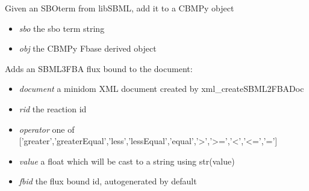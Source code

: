 \documentclass[a4paper,11pt,english]{sphinxmanual}
\begin{document}

\begin{fulllineitems}
\label{modules_doc:cbmpy.CBXML.setCBSBOterm}
Given an SBOterm from libSBML, add it to a CBMPy object
\begin{itemize}
\item {} 
\emph{sbo} the sbo term string

\item {} 
\emph{obj} the CBMPy Fbase derived object

\end{itemize}

\end{fulllineitems}


\begin{fulllineitems}
\label{modules_doc:cbmpy.CBXML.xml_addSBML2FBAFluxBound}
Adds an SBML3FBA flux bound to the document:
\begin{itemize}
\item {} 
\emph{document} a minidom XML document created by xml\_createSBML2FBADoc

\item {} 
\emph{rid} the reaction id

\item {} 
\emph{operator} one of {[}'greater','greaterEqual','less','lessEqual','equal','\textgreater{}','\textgreater{}=','\textless{}','\textless{}=','='{]}

\item {} 
\emph{value} a float which will be cast to a string using str(value)

\item {} 
\emph{fbid} the flux bound id, autogenerated by default

\end{itemize}

\end{fulllineitems}

\end{document}
